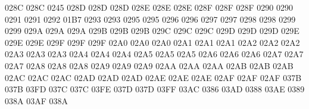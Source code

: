 \setcclcuc 028C 028C 0245 %
\setcclcuc 028D 028D 028D %
\setcclcuc 028E 028E 028E %
\setcclcuc 028F 028F 028F %
 0290 0290 %
 0291 0291 %
 0292 01B7 %
 0293 0293 %
 0295 0295 %
 0296 0296 %
 0297 0297 %
 0298 0298 %
 0299 0299 %
\setcclcuc 029A 029A 029A %
\setcclcuc 029B 029B 029B %
\setcclcuc 029C 029C 029C %
\setcclcuc 029D 029D 029D %
\setcclcuc 029E 029E 029E %
\setcclcuc 029F 029F 029F %
\setcclcuc 02A0 02A0 02A0 %
\setcclcuc 02A1 02A1 02A1 %
\setcclcuc 02A2 02A2 02A2 %
\setcclcuc 02A3 02A3 02A3 %
\setcclcuc 02A4 02A4 02A4 %
\setcclcuc 02A5 02A5 02A5 %
\setcclcuc 02A6 02A6 02A6 %
\setcclcuc 02A7 02A7 02A7 %
\setcclcuc 02A8 02A8 02A8 %
\setcclcuc 02A9 02A9 02A9 %
\setcclcuc 02AA 02AA 02AA %
\setcclcuc 02AB 02AB 02AB %
\setcclcuc 02AC 02AC 02AC %
\setcclcuc 02AD 02AD 02AD %
\setcclcuc 02AE 02AE 02AE %
\setcclcuc 02AF 02AF 02AF %
\setcclcuc 037B 037B 03FD %
\setcclcuc 037C 037C 03FE %
\setcclcuc 037D 037D 03FF %
 03AC 0386 %
 03AD 0388 %
 03AE 0389 %
\setcclcuc 038A 03AF 038A %
